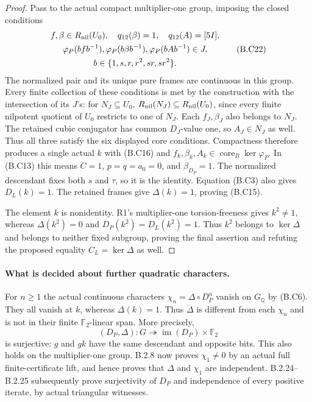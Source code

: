 \begin{proof}
Pass to the actual compact multiplier-one group, imposing
the closed conditions
\[
\begin{gathered}
 f,\beta\in R_{\rm nil}(U_0),\quad
 q_{12}(\beta)=1,\quad q_{12}(A)=[5I],\\
 \varphi_P(bfb^{-1}),\varphi_P(b\beta b^{-1}),
 \varphi_P(bAb^{-1})\in J,\\
 b\in\{1,s,r,r^2,sr,sr^2\}.
\end{gathered}                                         \tag{B.C22}
\]
The normalized pair and its unique pure frames are
continuous in this group.  Every finite collection of
these conditions is met by the construction with the
intersection of its $J$'s: for $N_J\subseteq U_0$,
$R_{\rm nil}(N_J)\subseteq R_{\rm nil}(U_0)$, since
every finite nilpotent quotient of $U_0$ restricts to
one of $N_J$.  Each $f_J,\beta_J$ also belongs to $N_J$.
The retained cubic conjugator has common $D_J$-value one,
so $A_J\in N_J$ as well.  Thus all three satisfy the six
displayed core conditions.
Compactness therefore produces a single actual $k$ with
(B.C16) and $f_k,\beta_k,A_k\in\operatorname{core}_B\ker\varphi_P$.
In (B.C13) this means $C=1$, $p=q=a_0=0$, and
$\beta_{D_P}=1$.  The normalized descendant fixes both
$s$ and $\tau$, so it is the identity.  Equation (B.C3)
also gives $D_L(k)=1$.  The retained frames give
$\Delta(k)=1$, proving (B.C15).

The element $k$ is nonidentity.  R1's multiplier-one
torsion-freeness gives $k^2\ne1$, whereas
$\Delta(k^2)=0$ and $D_P(k^2)=D_L(k^2)=1$.
Thus $k^2$ belongs to $\ker\Delta$ and belongs to neither
fixed subgroup, proving the final assertion and refuting
the proposed equality $C_L=\ker\Delta$ as well.
\end{proof}

\paragraph{What is decided about further quadratic characters.}
For $n\geq1$ the actual continuous characters
$\chi_n=\Delta\circ D_P^n$ vanish on $G_{\mathbb Q}$
by (B.C6).  They all vanish at $k$, whereas $\Delta(k)=1$.
Thus $\Delta$ is different from each $\chi_n$ and is not
in their finite $\mathbb F_2$-linear span.  More precisely,
\[
 (D_P,\Delta):G\twoheadrightarrow
                    \operatorname{im}(D_P)\times\mathbb F_2
 \tag{B.C23}
\]
is surjective: $g$ and $gk$ have the same descendant and
opposite bits.  This also holds on the multiplier-one
group.  B.2.8 now proves $\chi_1\ne0$ by an actual full
finite-certificate lift, and hence proves that $\Delta$
and $\chi_1$ are independent. B.2.24--B.2.25 subsequently
prove surjectivity of $D_P$ and independence of every
positive iterate, by actual triangular witnesses.

